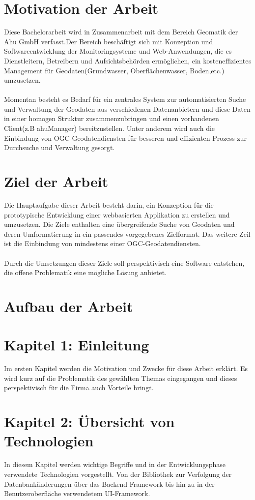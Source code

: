 \documentclass[a4paper,12pt]{scrreprt}
\begin{document}
\section{Motivation der Arbeit}
Diese Bachelorarbeit wird in Zusammenarbeit mit dem Bereich Geomatik der Ahu GmbH verfasst.Der Bereich beschäftigt sich mit Konzeption und Softwareentwicklung der Monitoringsysteme und Web-Anwendungen, die es Dienstleitern, Betreibern und Aufsichtsbehörden ermöglichen, ein kosteneffizientes Management für Geodaten(Grundwasser, Oberflächenwasser, Boden,etc.) umzusetzen. \\ \\
Momentan besteht es Bedarf für ein zentrales System zur automatisierten Suche und Verwaltung der Geodaten aus verschiedenen Datenanbietern und diese Daten in einer homogen Struktur zusammenzubringen und einen vorhandenen Client(z.B ahuManager) bereitzustellen. Unter anderem  wird auch die Einbindung von OGC-Geodatendiensten für besseren und effizienten Prozess zur Durchsuche und Verwaltung gesorgt. 

\section{Ziel der Arbeit}
Die Hauptaufgabe dieser Arbeit besteht darin, ein Konzeption für die prototypische Entwicklung einer webbasierten Applikation zu erstellen und umzusetzen. Die Ziele enthalten eine übergreifende Suche von Geodaten und deren Umformatierung in ein passendes vorgegebenes Zielformat. Das weitere Zeil ist die Einbindung von mindestens einer OGC-Geodatendiensten.\\ \\ Durch die Umsetzungen dieser Ziele soll perspektivisch eine Software entstehen, die offene Problematik eine mögliche Lösung anbietet.

\section{Aufbau der Arbeit}
\section*{\small \textbf{Kapitel 1: Einleitung}}
Im ersten Kapitel werden die Motivation und Zwecke für diese Arbeit erklärt. Es wird kurz auf die Problematik des gewählten Themas eingegangen und dieses perspektivisch für die Firma auch Vorteile bringt.

\section*{\small \textbf{Kapitel 2: Übersicht von Technologien}}
In diesem Kapitel werden wichtige Begriffe und in der Entwicklungsphase verwendete Technologien vorgestellt. Von der Bibliothek zur Verfolgung der Datenbankänderungen über das Backend-Framework bis hin zu in der Benutzeroberfläche verwendetem UI-Framework.   
\end{document}

